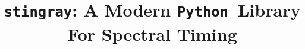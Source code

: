 \documentclass[twocolumn]{aastex62}
\newcommand{\python}{\texttt{Python}\xspace}
\newcommand{\stingray}{\texttt{stingray}\xspace}
\begin{document}
\title{\stingray: A Modern \python\ Library For Spectral Timing}


\end{document}
